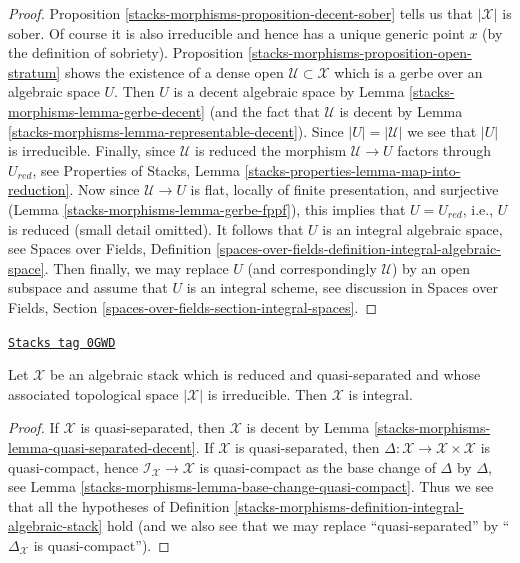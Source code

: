 \begin{proof}
Proposition \ref{stacks-morphisms-proposition-decent-sober} tells us that $|\mathcal{X}|$
is sober. Of course it is also irreducible and hence has a unique generic
point $x$ (by the definition of sobriety).
Proposition \ref{stacks-morphisms-proposition-open-stratum} shows
the existence of a dense open $\mathcal{U} \subset \mathcal{X}$
which is a gerbe over an algebraic space $U$.
Then $U$ is a decent algebraic space by
Lemma \ref{stacks-morphisms-lemma-gerbe-decent} (and the fact that $\mathcal{U}$
is decent by Lemma \ref{stacks-morphisms-lemma-representable-decent}).
Since $|U| = |\mathcal{U}|$ we see that $|U|$ is irreducible.
Finally, since $\mathcal{U}$ is reduced the morphism
$\mathcal{U} \to U$ factors through $U_{red}$, see
Properties of Stacks, Lemma \ref{stacks-properties-lemma-map-into-reduction}.
Now since $\mathcal{U} \to U$ is flat, locally of finite presentation,
and surjective (Lemma \ref{stacks-morphisms-lemma-gerbe-fppf}), this implies that
$U = U_{red}$, i.e., $U$ is reduced (small detail omitted).
It follows that $U$ is an integral algebraic space, see
Spaces over Fields, Definition
\ref{spaces-over-fields-definition-integral-algebraic-space}.
Then finally, we may replace $U$ (and correspondingly $\mathcal{U}$)
by an open subspace and assume that $U$ is an integral scheme, see
discussion in  Spaces over Fields, Section
\ref{spaces-over-fields-section-integral-spaces}.
\end{proof}

\begin{lemma}
\label{stacks-morphisms-lemma-totaro-case}
\href{https://stacks.math.columbia.edu/tag/0GWD}{\texttt{Stacks tag 0GWD}}

Let $\mathcal{X}$ be an algebraic stack which is reduced and quasi-separated
and whose associated topological space $|\mathcal{X}|$ is irreducible.
Then $\mathcal{X}$ is integral.
\end{lemma}

\begin{proof}
If $\mathcal{X}$ is quasi-separated, then $\mathcal{X}$ is decent
by Lemma \ref{stacks-morphisms-lemma-quasi-separated-decent}.
If $\mathcal{X}$ is quasi-separated, then
$\Delta : \mathcal{X} \to \mathcal{X} \times \mathcal{X}$ is quasi-compact,
hence $\mathcal{I}_\mathcal{X} \to \mathcal{X}$ is quasi-compact
as the base change of $\Delta$ by $\Delta$, see
Lemma \ref{stacks-morphisms-lemma-base-change-quasi-compact}.
Thus we see that all the hypotheses of
Definition \ref{stacks-morphisms-definition-integral-algebraic-stack} hold
(and we also see that we may replace ``quasi-separated'' by
``$\Delta_\mathcal{X}$ is quasi-compact'').
\end{proof}

